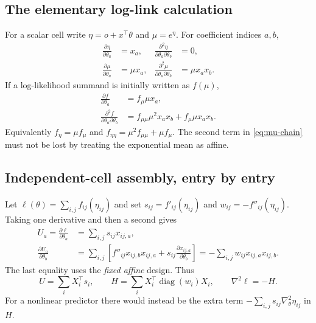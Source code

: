 \documentclass[11pt,a4paper]{article}
\newcommand{\diag}{\operatorname{diag}}
\numberwithin{equation}{section}
\begin{document}
\subsection{The elementary log-link calculation}
For a scalar cell write $\eta=o+x^\top\theta$ and $\mu=e^\eta$.
For coefficient indices $a,b$,
\begin{align}
 \frac{\partial\eta}{\partial\theta_a}&=x_a,&
 \frac{\partial^2\eta}{\partial\theta_a\partial\theta_b}&=0,\\
 \frac{\partial\mu}{\partial\theta_a}&=\mu x_a,&
 \frac{\partial^2\mu}{\partial\theta_a\partial\theta_b}&=\mu x_ax_b.
\end{align}
If a log-likelihood summand is initially written as $f(\mu)$,
\begin{align}
 \frac{\partial f}{\partial\theta_a}
 &=f_\mu\mu x_a,\\
 \frac{\partial^2f}{\partial\theta_a\partial\theta_b}
 &=f_{\mu\mu}\mu^2x_ax_b+f_\mu\mu x_ax_b.
 \label{eq:mu-chain}
\end{align}
Equivalently $f_\eta=\mu f_\mu$ and
$f_{\eta\eta}=\mu^2 f_{\mu\mu}+\mu f_\mu$.
The second term in \eqref{eq:mu-chain} must not be lost by treating
the exponential mean as affine.

\subsection{Independent-cell assembly, entry by entry}
Let $\ell(\theta)=\sum_{i,j}f_{ij}(\eta_{ij})$ and set
$s_{ij}=f'_{ij}(\eta_{ij})$ and $w_{ij}=-f''_{ij}(\eta_{ij})$.
Taking one derivative and then a second gives
\begin{align}
 U_a=\frac{\partial\ell}{\partial\theta_a}
 &=\sum_{i,j}s_{ij}x_{ij,a},\\
 \frac{\partial U_a}{\partial\theta_b}
 &=\sum_{i,j}\left[
    f''_{ij}x_{ij,b}x_{ij,a}
    +s_{ij}\frac{\partial x_{ij,a}}{\partial\theta_b}\right]
 =-\sum_{i,j}w_{ij}x_{ij,a}x_{ij,b}.
\end{align}
The last equality uses the \emph{fixed affine} design.
Thus
\begin{equation}\label{eq:master}
 U=\sum_iX_i^\top s_i,\qquad
 H=\sum_iX_i^\top\diag(w_i)X_i,\qquad
 \nabla^2\ell=-H.
\end{equation}
For a nonlinear predictor there would instead be the extra term
$-\sum_{i,j}s_{ij}\nabla_\theta^2\eta_{ij}$ in $H$.
\end{document}
